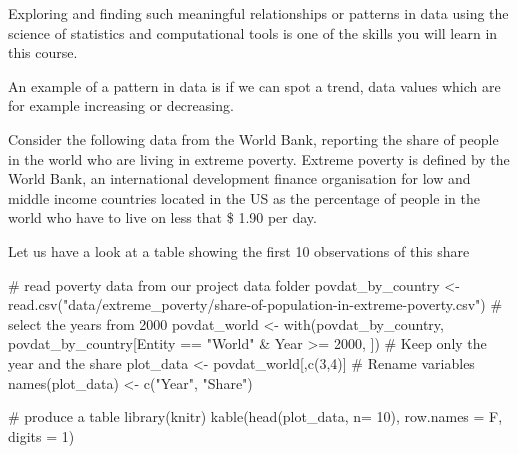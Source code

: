 \documentclass[
  letterpaper,
]{scrbook}
\newenvironment{Shaded}{\begin{snugshade}}{\end{snugshade}}
\newcommand{\AttributeTok}[1]{\textcolor[rgb]{0.40,0.45,0.13}{#1}}
\newcommand{\CommentTok}[1]{\textcolor[rgb]{0.37,0.37,0.37}{#1}}
\newcommand{\DecValTok}[1]{\textcolor[rgb]{0.68,0.00,0.00}{#1}}
\newcommand{\FunctionTok}[1]{\textcolor[rgb]{0.28,0.35,0.67}{#1}}
\newcommand{\NormalTok}[1]{\textcolor[rgb]{0.00,0.23,0.31}{#1}}
\newcommand{\OtherTok}[1]{\textcolor[rgb]{0.00,0.23,0.31}{#1}}
\newcommand{\SpecialCharTok}[1]{\textcolor[rgb]{0.37,0.37,0.37}{#1}}
\newcommand{\StringTok}[1]{\textcolor[rgb]{0.13,0.47,0.30}{#1}}
\begin{document}
Exploring and finding such meaningful relationships or patterns in data
using the science of statistics and computational tools is one of the
skills you will learn in this course.

An example of a pattern in data is if we can spot a trend, data values
which are for example increasing or decreasing.

Consider the following data from the World Bank, reporting the share of
people in the world who are living in extreme poverty. Extreme poverty
is defined by the World Bank, an international development finance
organisation for low and middle income countries located in the
US as the
percentage of people in the world who have to live on less that \$ 1.90
per day.

Let us have a look at a table showing the first 10 observations of this
share

\begin{Shaded}
\begin{Highlighting}[]
\CommentTok{\# read poverty data from our project data folder}
\NormalTok{povdat\_by\_country }\OtherTok{\textless{}{-}} \FunctionTok{read.csv}\NormalTok{(}\StringTok{"data/extreme\_poverty/share{-}of{-}population{-}in{-}extreme{-}poverty.csv"}\NormalTok{)}
\CommentTok{\# select the years from 2000}
\NormalTok{povdat\_world }\OtherTok{\textless{}{-}} \FunctionTok{with}\NormalTok{(povdat\_by\_country, povdat\_by\_country[Entity }\SpecialCharTok{==} \StringTok{"World"} \SpecialCharTok{\&}\NormalTok{ Year }\SpecialCharTok{\textgreater{}=} \DecValTok{2000}\NormalTok{, ])}
\CommentTok{\# Keep only the year and the share}
\NormalTok{plot\_data }\OtherTok{\textless{}{-}}\NormalTok{ povdat\_world[,}\FunctionTok{c}\NormalTok{(}\DecValTok{3}\NormalTok{,}\DecValTok{4}\NormalTok{)]}
\CommentTok{\# Rename variables}
\FunctionTok{names}\NormalTok{(plot\_data) }\OtherTok{\textless{}{-}} \FunctionTok{c}\NormalTok{(}\StringTok{"Year"}\NormalTok{, }\StringTok{"Share"}\NormalTok{)}

\CommentTok{\# produce a table}
\FunctionTok{library}\NormalTok{(knitr)}
\FunctionTok{kable}\NormalTok{(}\FunctionTok{head}\NormalTok{(plot\_data, }\AttributeTok{n=} \DecValTok{10}\NormalTok{), }\AttributeTok{row.names =}\NormalTok{ F, }\AttributeTok{digits =} \DecValTok{1}\NormalTok{)}
\end{Highlighting}
\end{Shaded}
\end{document}
